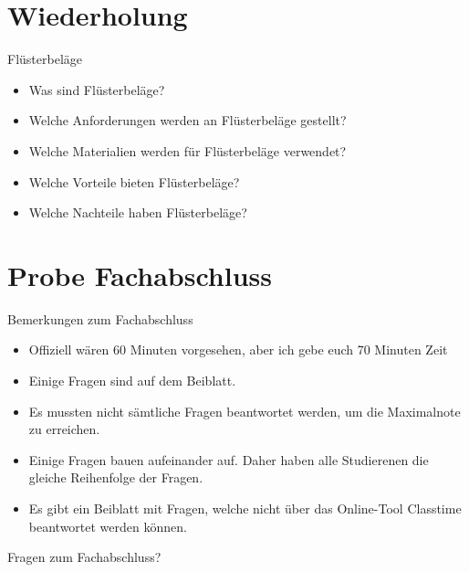 \section{Wiederholung}
\BlueSectionSlide

\begin{frame}{Flüsterbeläge}
    \begin{itemize}
        \item[\textbullet] Was sind Flüsterbeläge?
        \item[\textbullet] Welche Anforderungen werden an Flüsterbeläge gestellt?
        \item[\textbullet] Welche Materialien werden für Flüsterbeläge verwendet?
        \item[\textbullet] Welche Vorteile bieten Flüsterbeläge?
        \item[\textbullet] Welche Nachteile haben Flüsterbeläge?
    \end{itemize}
\end{frame}



\section{Probe Fachabschluss}
\BlueSectionSlide


\begin{frame}{Bemerkungen zum Fachabschluss}
    \begin{itemize}
        \item[\textbullet] Offiziell wären 60 Minuten vorgesehen, aber ich gebe euch 70 Minuten Zeit
        \item[\textbullet] Einige Fragen sind auf dem Beiblatt. 
        \item[\textbullet] Es mussten nicht sämtliche Fragen beantwortet werden, um die Maximalnote zu erreichen. 
        \item[\textbullet] Einige Fragen bauen aufeinander auf. Daher haben alle Studierenen die gleiche Reihenfolge der Fragen. 
        \item[\textbullet] Es gibt ein Beiblatt mit Fragen, welche nicht über das Online-Tool Classtime beantwortet werden können.
    \end{itemize}

\end{frame}

\begin{frame}{Fragen zum Fachabschluss?}

\end{frame}


